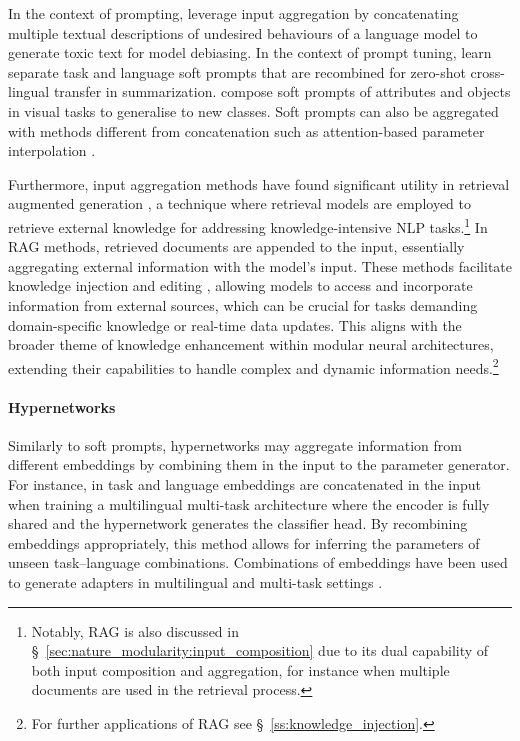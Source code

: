 \documentclass[10pt]{article} %
\begin{document}
In the context of prompting, \cite{Schick2021SelfDiagnosis} leverage input aggregation by concatenating multiple textual descriptions of undesired behaviours of a language model to generate toxic text for model debiasing. In the context of prompt tuning, \cite{vu-etal-2022-overcoming} learn separate task and language soft prompts that are recombined for zero-shot cross-lingual transfer in summarization.
\cite{nayak2022learning} compose soft prompts of attributes and objects in visual tasks to generalise to new classes. Soft prompts can also be aggregated with methods different from concatenation such as attention-based parameter interpolation \citep{asai-etal-2022-attempt}. 

Furthermore, input aggregation methods have found significant utility in retrieval augmented generation \citep{lewis2020retrieval}, a technique where retrieval models are employed to retrieve external knowledge for addressing knowledge-intensive NLP tasks.\footnote{Notably, RAG is also discussed  in \S~\ref{sec:nature_modularity:input_composition} due to its dual capability of both input composition and aggregation, for instance when multiple documents are used in the retrieval process.} In RAG methods, retrieved documents are appended to the input, essentially aggregating external information with the model's input.  These methods facilitate knowledge injection and editing \citep{verga-etal-2021-adaptable, cheng-etal-2023-decouple}, allowing models to access and incorporate information from external sources, which can be crucial for tasks demanding domain-specific knowledge or real-time data updates. This aligns with the broader theme of knowledge enhancement within modular neural architectures, extending their capabilities to handle complex and dynamic information needs.\footnote{For further applications of RAG see \S~\ref{ss:knowledge_injection}.} 

\paragraph*{Hypernetworks}
Similarly to soft prompts, hypernetworks may aggregate information from different embeddings by combining them in the input to the parameter generator. For instance, in \citep{ponti-etal-2021-parameter} task and language embeddings are concatenated in the input when training a multilingual multi-task architecture where the encoder is fully shared and the hypernetwork generates the classifier head. By recombining embeddings appropriately, this method allows for inferring the parameters of unseen task--language combinations. Combinations of embeddings have been used to generate adapters in multilingual \citep{Ustun2020} and multi-task settings \citep{mahabadi2021parameter,pilault2021conditionally}. 
 
\end{document}
